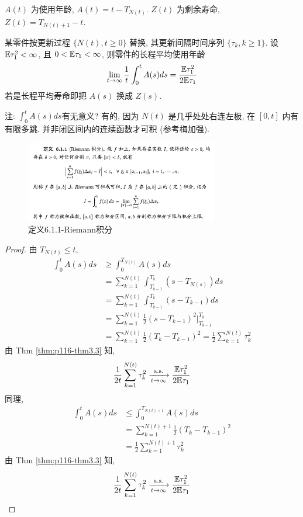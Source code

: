 $A(t)$ 为使用年龄, $A(t)=t-T_{N(t)}$. $Z(t)$ 为剩余寿命, $Z(t)=T_{N(t)+1}-t$.

\begin{example}
    某零件按更新过程 $\{N(t),t\geq 0\}$ 替换, 其更新间隔时间序列 $\{\tau_k,k\geq 1\}$. 设 $\mathbb E \tau_1^2<\infty$, 且 $0<\mathbb E\tau_1<\infty$, 则零件的长程平均使用年龄
    \[
    \lim_{t \to \infty}\frac{1}{t}\int_0^tA(s)ds=\frac{\mathbb E\tau_1^2}{2\mathbb E\tau_1}
    \]
    若是长程平均寿命即把 $A(s)$ 换成 $Z(s)$.
\end{example}
注: $\int_0^tA(s)ds$有无意义? 有的, 因为 $N(t)$ 是几乎处处右连左极, 在 $[0,t]$ 内有有限多跳. 并非闭区间内的连续函数才可积 (参考梅加强\cite{jiaqiang}).
\begin{figure}[H]
\centering
\includegraphics[width=0.75\textwidth]{figures/Riemann-integral.png}
\caption{定义6.1.1-Riemann积分}
\end{figure}

\begin{proof}
    由 $T_{N(t)}\leq t$,
    \[
    \begin{aligned}
        \int_0^t A(s)ds &\geq \int_0^{T_{N(t)}}A(s)ds\\
        &=\sum_{k=1}^{N(t)}\int_{T_{k-1}}^{T_k}(s-T_{N(s)})ds\\
        &=\sum_{k=1}^{N(t)}\int_{T_{k-1}}^{T_k}(s-T_{k-1})ds\\
        &=\sum_{k=1}^{N(t)}\frac{1}{2}(s-T_{k-1})^2\bigg|_{T_{k-1}}^{T_k}\\
        &=\sum_{k=1}^{N(t)}\frac{1}{2}(T_k-T_{k-1})^2=\frac{1}{2}\sum_{k=1}^{N(t)}\tau_k^2
    \end{aligned}
    \]
    由 Thm \ref{thm:p116-thm3.3} 知,
    \[
    \frac{1}{2t}\sum_{k=1}^{N(t)}\tau_k^2\xrightarrow[t\to\infty]{\text{a.s.}}\frac{\mathbb E \tau_1^2}{2\mathbb E\tau_1}
    \]
    同理,
    \[
    \begin{aligned}
        \int_0^t A(s)ds &\leq \int_0^{T_{N(t)+1}} A(s)ds\\
        &=\sum_{k=1}^{N(t)+1}\frac{1}{2}(T_k-T_{k-1})^2\\
        &=\frac{1}{2}\sum_{k=1}^{N(t)+1}\tau_k^2
    \end{aligned}
    \]
    由 Thm \ref{thm:p116-thm3.3} 知,
    \[
        \frac{1}{2t}\sum_{k=1}^{N(t)}\tau_k^2\xrightarrow[t\to\infty]{\text{a.s.}}\frac{\mathbb E \tau_1^2}{2\mathbb E\tau_1}
    \]
\end{proof}
\newpage